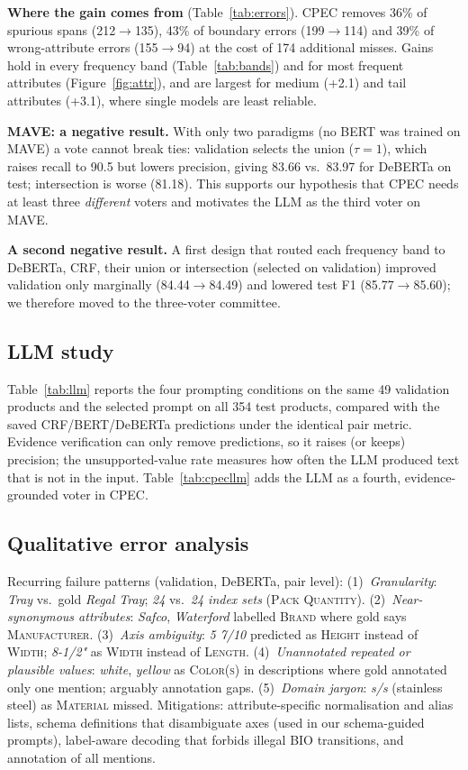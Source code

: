 \documentclass[10pt,twocolumn,a4paper]{article}
\begin{document}
\textbf{Where the gain comes from} (Table~\ref{tab:errors}). CPEC removes 36\% of spurious spans (212$\rightarrow$135), 43\% of boundary errors (199$\rightarrow$114) and 39\% of wrong-attribute errors (155$\rightarrow$94) at the cost of 174 additional misses. Gains hold in every frequency band (Table~\ref{tab:bands}) and for most frequent attributes (Figure~\ref{fig:attr}), and are largest for medium (+2.1) and tail attributes (+3.1), where single models are least reliable.

\textbf{MAVE: a negative result.} With only two paradigms (no BERT was trained on MAVE) a vote cannot break ties: validation selects the union ($\tau{=}1$), which raises recall to 90.5 but lowers precision, giving 83.66 vs.\ 83.97 for DeBERTa on test; intersection is worse (81.18). This supports our hypothesis that CPEC needs at least three \emph{different} voters and motivates the LLM as the third voter on MAVE.

\textbf{A second negative result.} A first design that routed each frequency band to DeBERTa, CRF, their union or intersection (selected on validation) improved validation only marginally (84.44$\rightarrow$84.49) and lowered test F1 (85.77$\rightarrow$85.60); we therefore moved to the three-voter committee.

\subsection{LLM study}


Table~\ref{tab:llm} reports the four prompting conditions on the same 49 validation products and the selected prompt on all 354 test products, compared with the saved CRF/BERT/DeBERTa predictions under the identical pair metric. Evidence verification can only remove predictions, so it raises (or keeps) precision; the unsupported-value rate measures how often the LLM produced text that is not in the input. Table~\ref{tab:cpecllm} adds the LLM as a fourth, evidence-grounded voter in CPEC.

\subsection{Qualitative error analysis}
Recurring failure patterns (validation, DeBERTa, pair level): (1)~\emph{Granularity}: \emph{Tray} vs.\ gold \emph{Regal Tray}; \emph{24} vs.\ \emph{24 index sets} (\textsc{Pack Quantity}). (2)~\emph{Near-synonymous attributes}: \emph{Safco}, \emph{Waterford} labelled \textsc{Brand} where gold says \textsc{Manufacturer}. (3)~\emph{Axis ambiguity}: \emph{5 7/10} predicted as \textsc{Height} instead of \textsc{Width}; \emph{8-1/2"} as \textsc{Width} instead of \textsc{Length}. (4)~\emph{Unannotated repeated or plausible values}: \emph{white}, \emph{yellow} as \textsc{Color(s)} in descriptions where gold annotated only one mention; arguably annotation gaps. (5)~\emph{Domain jargon}: \emph{s/s} (stainless steel) as \textsc{Material} missed. Mitigations: attribute-specific normalisation and alias lists, schema definitions that disambiguate axes (used in our schema-guided prompts), label-aware decoding that forbids illegal BIO transitions, and annotation of all mentions.
\end{document}
